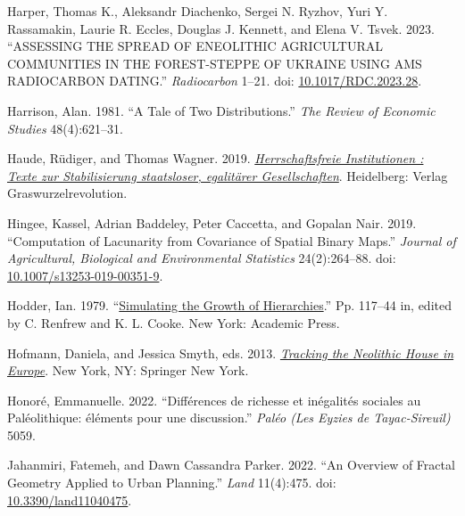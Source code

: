 \documentclass[
  12pt,
]{book}
\newlength{\cslhangindent}
\newlength{\cslentryspacingunit} %
\newenvironment{CSLReferences}[2] %
 {%
  \setlength{\parindent}{0pt}
  \ifodd #1
  \let\oldpar\par
  \def\par{\hangindent=\cslhangindent\oldpar}
  \fi
  \setlength{\parskip}{#2\cslentryspacingunit}
 }%
 {}
\begin{document}
\begin{CSLReferences}{1}{0}
\leavevmode{}%
Harper, Thomas K., Aleksandr Diachenko, Sergei N. Ryzhov, Yuri Y. Rassamakin, Laurie R. Eccles, Douglas J. Kennett, and Elena V. Tsvek. 2023. {``ASSESSING THE SPREAD OF ENEOLITHIC AGRICULTURAL COMMUNITIES IN THE FOREST-STEPPE OF UKRAINE USING AMS RADIOCARBON DATING.''} \emph{Radiocarbon} 1--21. doi: \href{https://doi.org/10.1017/RDC.2023.28}{10.1017/RDC.2023.28}.

\leavevmode{}%
Harrison, Alan. 1981. {``A Tale of Two Distributions.''} \emph{The Review of Economic Studies} 48(4):621--31.

\leavevmode{}%
Haude, Rüdiger, and Thomas Wagner. 2019. \emph{\href{http://www.deutsche-digitale-bibliothek.de/item/7WYRGHTXGAOZOF5JUQ5JQCONFJKLTBIE}{Herrschaftsfreie Institutionen : Texte zur Stabilisierung staatsloser, egalitärer Gesellschaften}}. Heidelberg: Verlag Graswurzelrevolution.

\leavevmode{}%
Hingee, Kassel, Adrian Baddeley, Peter Caccetta, and Gopalan Nair. 2019. {``Computation of Lacunarity from Covariance of Spatial Binary Maps.''} \emph{Journal of Agricultural, Biological and Environmental Statistics} 24(2):264--88. doi: \href{https://doi.org/10.1007/s13253-019-00351-9}{10.1007/s13253-019-00351-9}.

\leavevmode{}%
Hodder, Ian. 1979. {``\href{https://doi.org/10.1016/B978-0-12-586050-5.50015-4}{Simulating the Growth of Hierarchies}.''} Pp. 117--44 in, edited by C. Renfrew and K. L. Cooke. New York: Academic Press.

\leavevmode{}%
Hofmann, Daniela, and Jessica Smyth, eds. 2013. \emph{\href{https://doi.org/10.1007/978-1-4614-5289-8}{Tracking the Neolithic House in Europe}}. New York, NY: Springer New York.

\leavevmode{}%
Honoré, Emmanuelle. 2022. {``Différences de richesse et inégalités sociales au Paléolithique: éléments pour une discussion.''} \emph{Paléo (Les Eyzies de Tayac-Sireuil)} 5059.

\leavevmode{}%
Jahanmiri, Fatemeh, and Dawn Cassandra Parker. 2022. {``An Overview of Fractal Geometry Applied to Urban Planning.''} \emph{Land} 11(4):475. doi: \href{https://doi.org/10.3390/land11040475}{10.3390/land11040475}.


\end{CSLReferences}
\end{document}
